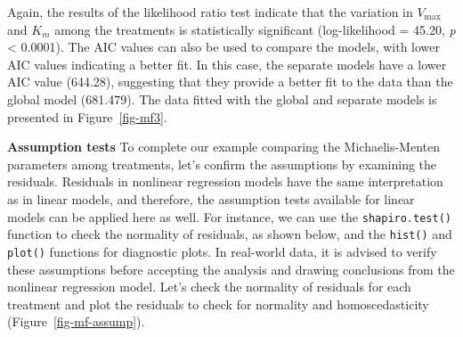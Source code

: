 \documentclass[
  letterpaper,
]{book}
\begin{document}
Again, the results of the likelihood ratio test indicate that the
variation in \(V_{\max}\) and \(K_m\) among the treatments is
statistically significant (log-likelihood = 45.20, \emph{p} \textless{}
0.0001). The AIC values can also be used to compare the models, with
lower AIC values indicating a better fit. In this case, the separate
models have a lower AIC value (644.28), suggesting that they provide a
better fit to the data than the global model (681.479). The data fitted
with the global and separate models is presented in
Figure~\ref{fig-mf3}.

\textbf{Assumption tests} To complete our example comparing the
Michaelis-Menten parameters among treatments, let's confirm the
assumptions by examining the residuals. Residuals in nonlinear
regression models have the same interpretation as in linear models, and
therefore, the assumption tests available for linear models can be
applied here as well. For instance, we can use the
\texttt{shapiro.test()} function to check the normality of residuals, as
shown below, and the \texttt{hist()} and \texttt{plot()} functions for
diagnostic plots. In real-world data, it is advised to verify these
assumptions before accepting the analysis and drawing conclusions from
the nonlinear regression model. Let's check the normality of residuals
for each treatment and plot the residuals to check for normality and
homoscedasticity (Figure~\ref{fig-mf-assump}).
\end{document}
